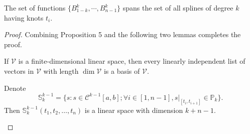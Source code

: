 \begin{sol}
  \begin{prop}
    The set of functions $\{B_{1-k}^k, \cdots, B_{n-1}^k\}$
    spans the set of all splines of degree $k$ having knots $t_i$.
  \end{prop}
  \begin{proof}
    Combining Proposition 5 and the following two lemmas
    completes the proof.
    \begin{lem}
      If $\mathcal{V}$ is a finite-dimensional linear space,
      then every linearly independent list of vectors in $\mathcal{V}$
      with length $\dim \mathcal{V}$ is a basis of $\mathcal{V}$.
    \end{lem}
    \begin{lem}
      Denote
      \begin{displaymath}
        \mathbb{S}_k^{k-1} = \{s: s\in\mathcal{C}^{k-1}[a, b];
        \forall i\in[1, n-1], s|_{[t_i, t_{i+1}]} \in\mathbb{P}_k\}.
      \end{displaymath}
      Then $\mathbb{S}_k^{k-1}(t_1, t_2, \ldots, t_n)$ is a linear
      space with dimension $k+n-1$.
    \end{lem}
  \end{proof}
\end{sol}
